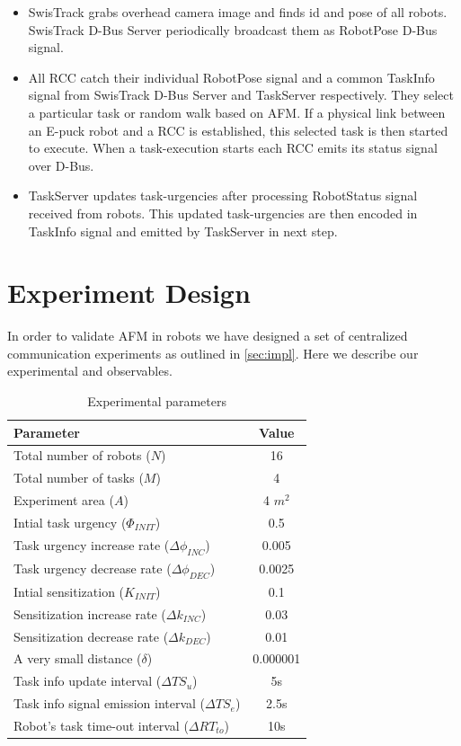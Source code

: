 \documentclass{llncs}
\begin{document}
\begin{itemize}
\item SwisTrack grabs overhead camera image and finds id and pose of all robots.  SwisTrack D-Bus Server periodically  broadcast them as RobotPose D-Bus signal.
\item All RCC catch their individual RobotPose signal and a common TaskInfo signal from SwisTrack D-Bus Server and TaskServer respectively. They select a particular task or random walk based on AFM. If a physical link between an E-puck robot and a RCC is established, this selected task is then started to execute. When a task-execution starts each RCC emits its status signal over D-Bus.
\item TaskServer updates task-urgencies after processing RobotStatus signal received from robots. This updated task-urgencies are then encoded in TaskInfo signal and emitted by TaskServer in next step.
\end{itemize}
\section{Experiment Design}
\label{sec:expt-design}
In order to validate AFM in robots we have designed a set of centralized communication experiments as outlined in \ref{sec:impl}. Here we describe our experimental 
 and observables.
%
\begin{table}
\caption{Experimental parameters}
\label{table:params}
\begin{center}
\begin{tabular}{|l||c|}
\hline Parameter & Value\\
\hline Total number of robots ($N$) & 16\\
\hline Total number of tasks ($M$) & 4\\
\hline Experiment area ($A$) & 4 $m^2$\\
\hline Intial task urgency ($\Phi_{INIT}$) & 0.5\\
\hline Task urgency increase rate ($\Delta\phi_{INC}$) & 0.005\\
\hline Task urgency decrease rate ($\Delta\phi_{DEC}$) & 0.0025\\
\hline Intial sensitization ($K_{INIT}$) & 0.1\\
\hline Sensitization increase rate ($\Delta k_{INC}$) & 0.03\\
\hline Sensitization decrease rate ($\Delta k_{DEC}$) & 0.01\\
\hline A very small distance ($\delta$)& 0.000001\\
\hline Task info update interval ($\Delta TS_{u}$) & 5s\\
\hline Task info signal emission interval ($ \Delta TS_{e}$)& 2.5s\\
\hline Robot's task time-out interval ($\Delta RT_{to} $)& 10s\\
\hline
\end{tabular}
\end{center}
\end{table}
% 
\end{document}

